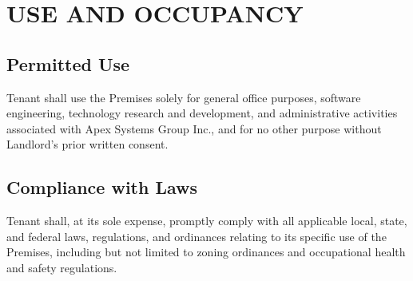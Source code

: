 \section{USE AND OCCUPANCY}
\subsection{Permitted Use}
Tenant shall use the Premises solely for general office purposes, software engineering, technology research and development, and administrative activities associated with Apex Systems Group Inc., and for no other purpose without Landlord's prior written consent.

\subsection{Compliance with Laws}
Tenant shall, at its sole expense, promptly comply with all applicable local, state, and federal laws, regulations, and ordinances relating to its specific use of the Premises, including but not limited to zoning ordinances and occupational health and safety regulations.
